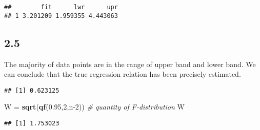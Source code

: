 \documentclass[
]{article}
\newenvironment{Shaded}{\begin{snugshade}}{\end{snugshade}}
\newcommand{\CommentTok}[1]{\textcolor[rgb]{0.56,0.35,0.01}{\textit{#1}}}
\newcommand{\DecValTok}[1]{\textcolor[rgb]{0.00,0.00,0.81}{#1}}
\newcommand{\FloatTok}[1]{\textcolor[rgb]{0.00,0.00,0.81}{#1}}
\newcommand{\KeywordTok}[1]{\textcolor[rgb]{0.13,0.29,0.53}{\textbf{#1}}}
\newcommand{\NormalTok}[1]{#1}
\newcommand{\OperatorTok}[1]{\textcolor[rgb]{0.81,0.36,0.00}{\textbf{#1}}}
\newcommand{\StringTok}[1]{\textcolor[rgb]{0.31,0.60,0.02}{#1}}
\begin{document}
\begin{verbatim}
##        fit      lwr      upr
## 1 3.201209 1.959355 4.443063
\end{verbatim}

\hypertarget{section-10}{%
\subsection{2.5}\label{section-10}}

The majority of data points are in the range of upper band and lower
band. We can conclude that the true regression relation has been
precisely estimated.

\begin{Shaded}
\end{Shaded}

\begin{verbatim}
## [1] 0.623125
\end{verbatim}

\begin{Shaded}
\begin{Highlighting}[]
\NormalTok{W =}\StringTok{ }\KeywordTok{sqrt}\NormalTok{(}\KeywordTok{qf}\NormalTok{(}\FloatTok{0.95}\NormalTok{,}\DecValTok{2}\NormalTok{,n}\DecValTok{-2}\NormalTok{))  }\CommentTok{# quantity of F-distribution}
\NormalTok{W}
\end{Highlighting}
\end{Shaded}

\begin{verbatim}
## [1] 1.753023
\end{verbatim}
\end{document}
